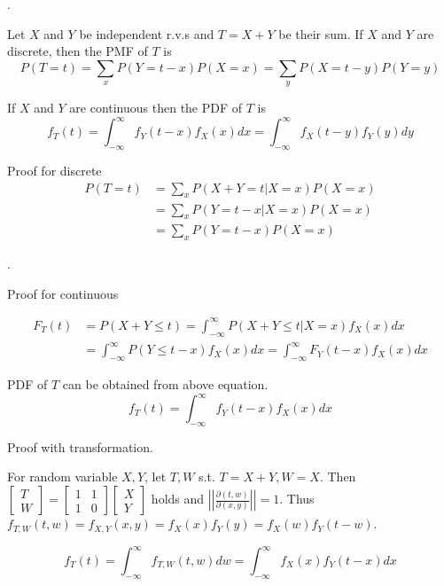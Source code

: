 \documentclass[8pt]{beamer}
\newcommand{\abs}[1]{\left\lvert #1 \right\rvert}
\begin{document}
\begin{frame}{.}
    \begin{theorem}
        Let $X$ and $Y$ be independent r.v.s and $T=X+Y$ be their sum. If $X$ and $Y$ are discrete, then the PMF of $T$ is 
        \[
            P(T=t) = \sum_x P(Y=t-x) P(X=x) = \sum_y P(X=t-y)P(Y=y)
        \]

        If $X$ and $Y$ are continuous then the PDF of $T$ is
        \[
            f_T(t) = \int_{-\infty}^\infty f_Y(t-x) f_X(x) dx = \int_{-\infty}^\infty f_X(t-y) f_Y(y) dy
        \]
    \end{theorem}

    Proof for discrete
    \[
    \begin{aligned}
        P(T=t) &= \sum_x P(X+Y=t|X=x)P(X=x) \\
        &= \sum_x P(Y = t-x|X=x) P(X=x) \\
        &= \sum_x P(Y=t-x) P(X=x)
    \end{aligned}
    \]
\end{frame}


\begin{frame}{.}

    Proof for continuous

    \[
    \begin{aligned}
        F_T(t) &= P(X+Y \leq t) =\int_{-\infty}^\infty P(X+Y\leq t |X=x)f_X(x) dx \\
        &= \int_{-\infty}^\infty P(Y \leq t-x)f_X(x) dx = \int_{-\infty}^\infty F_Y(t-x)f_X(x)dx
    \end{aligned}
    \]
    
    PDF of $T$ can be obtained from above equation.
    \[
        f_T(t) = \int_{-\infty}^\infty f_Y(t-x)f_X(x)dx
    \]

    Proof with transformation.

    For random variable $X,Y$, let $T, W$ s.t. $T = X+Y, W=X$. Then $ \left[\begin{matrix}
    T \\ W
    \end{matrix}\right] = \left[\begin{matrix}
        1 & 1 \\ 1 & 0
    \end{matrix}\right] \left[\begin{matrix}
        X \\ Y
    \end{matrix}\right]$ holds and $|\abs{\frac{\partial (t,w)}{\partial (x,y)}}|=1$. Thus $f_{T,W}(t,w) = f_{X,Y}(x,y) = f_{X}(x) f_{Y}(y) = f_X(w) f_Y(t-w)$.

    \[
        f_T(t) = \int_{-\infty}^\infty f_{T,W}(t,w) dw = \int_{-\infty}^\infty f_X(x) f_Y(t-x) dx
    \]
\end{frame}
\end{document}

